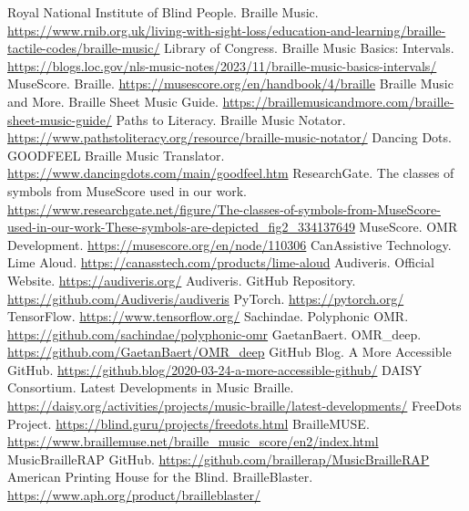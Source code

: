 \begin{thebibliography}{99}
 Royal National Institute of Blind People. Braille Music. \url{https://www.rnib.org.uk/living-with-sight-loss/education-and-learning/braille-tactile-codes/braille-music/}
 Library of Congress. Braille Music Basics: Intervals. \url{https://blogs.loc.gov/nls-music-notes/2023/11/braille-music-basics-intervals/}
 MuseScore. Braille. \url{https://musescore.org/en/handbook/4/braille}
 Braille Music and More. Braille Sheet Music Guide. \url{https://braillemusicandmore.com/braille-sheet-music-guide/}
 Paths to Literacy. Braille Music Notator. \url{https://www.pathstoliteracy.org/resource/braille-music-notator/}
 Dancing Dots. GOODFEEL Braille Music Translator. \url{https://www.dancingdots.com/main/goodfeel.htm}
 ResearchGate. The classes of symbols from MuseScore used in our work. \url{https://www.researchgate.net/figure/The-classes-of-symbols-from-MuseScore-used-in-our-work-These-symbols-are-depicted_fig2_334137649}
 MuseScore. OMR Development. \url{https://musescore.org/en/node/110306}
 CanAssistive Technology. Lime Aloud. \url{https://canasstech.com/products/lime-aloud}
 Audiveris. Official Website. \url{https://audiveris.org/}
 Audiveris. GitHub Repository. \url{https://github.com/Audiveris/audiveris}
 PyTorch. \url{https://pytorch.org/}
 TensorFlow. \url{https://www.tensorflow.org/}
 Sachindae. Polyphonic OMR. \url{https://github.com/sachindae/polyphonic-omr}
 GaetanBaert. OMR\_deep. \url{https://github.com/GaetanBaert/OMR\_deep}
 GitHub Blog. A More Accessible GitHub. \url{https://github.blog/2020-03-24-a-more-accessible-github/}
 DAISY Consortium. Latest Developments in Music Braille. \url{https://daisy.org/activities/projects/music-braille/latest-developments/}
 FreeDots Project. \url{https://blind.guru/projects/freedots.html}
 BrailleMUSE. \url{https://www.braillemuse.net/braille_music_score/en2/index.html}
 MusicBrailleRAP GitHub. \url{https://github.com/braillerap/MusicBrailleRAP}
 American Printing House for the Blind. BrailleBlaster. \url{https://www.aph.org/product/brailleblaster/}

\end{thebibliography}
